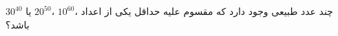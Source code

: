 چند عدد طبیعی وجود دارد که مقسوم علیه حداقل یکی از اعداد
			،$10^{60}$
			،$20^{50}$
			یا
			$30^{40}$
باشد؟
